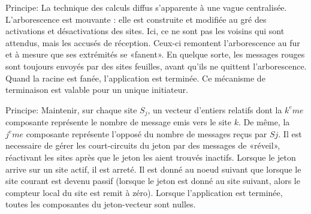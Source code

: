 \documentclass[a4paper,11pt]{article}
\begin{document}
Principe: La technique des calculs diffus s’apparente à une vague centralisée. L’arborescence est mouvante : elle est construite et modifiée au gré des activations et désactivations des sites. Ici, ce ne sont pas les voisins qui sont attendus, mais les accusés de réception. Ceux-ci remontent l’arborescence au fur et à mesure que ses extrémités se «fanent». En quelque sorte, les messages rouges sont toujours envoyés par des sites feuilles, avant qu’ils ne quittent l’arborescence. Quand la racine est fanée, l’application est terminée. Ce mécanisme de terminaison est valable pour un unique initiateur.



\newpage
Principe: Maintenir, sur chaque site $S_j$, un vecteur d’entiers relatifs dont la $k^eme$ composante représente le nombre de message emis vers le site $k$. De même, la $j^eme$ composante représente l'opposé du nombre de messages reçus par $Sj$. Il est necessaire de gérer les court-circuits du jeton par des messages de «réveil», réactivant les sites après que le jeton les aient trouvés inactifs. Lorsque le jeton arrive sur un site actif, il est arreté. Il est donné au noeud suivant que lorsque le site courant est devenu passif (lorsque le jeton est donné au site suivant, alors le compteur local du site est remit à zéro). Lorsque l'application est terminée, toutes les composantes du jeton-vecteur sont nulles.
\end{document}
